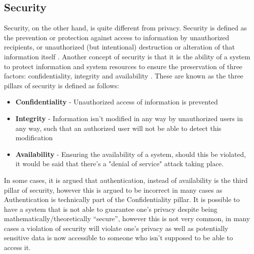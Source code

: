 \documentclass{sigchi}
\begin{document}
\subsection{Security} Security, on the other hand, is quite different from privacy. Security is defined as the prevention or protection against access to information by unauthorized recipients, or unauthorized (but intentional) destruction or alteration of that information itself \cite{schell2006webster}. Another concept of security is that it is the ability of a system to protect information and system resources to ensure the preservation of three factors: confidentiality, integrity and availability \cite{2_ross_2000}. These are known as the three pillars of security is defined as follows:
\begin{itemize}
\item \textbf{Confidentiality} - Unauthorized access of information is prevented
\item \textbf{Integrity} - Information isn't modified in any way by unauthorized users in any way, such that an authorized user will not be able to detect this modification
\item \textbf{Availability} - Ensuring the availability of a system, should this be violated, it would be said that there's a "denial of service" attack taking place.
\end{itemize}
In some cases, it is argued that authentication, instead of availability is the third pillar of security, however this is argued to be incorrect in many cases as Authentication is technically part of the Confidentiality pillar. It is possible to have a system that is not able to guarantee one's privacy despite being mathematically/theoretically ``secure'', however this is not very common, in many cases a violation of security will violate one's privacy as well as potentially sensitive data is now accessible to someone who isn't supposed to be able to access it.
\pagebreak
\end{document}
